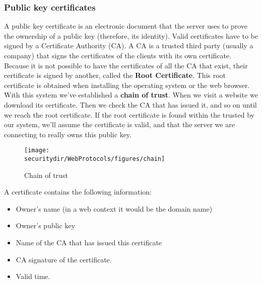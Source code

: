 \subsubsection{Public key certificates}
A public key certificate is an electronic document that the server uses to prove the ownership of a public key (therefore, its identity). Valid certificates have to be signed by a Certificate Authority (CA). A CA is a trusted third party (usually a company) that signs the certificates of the clients with its own certificate. Because it is not possible to have the certificates of all the CA that exist, their certificate is signed by another, called the \textbf{Root Certificate}. This root certificate is obtained when installing the operating system or the web browser. With this system we've established a \textbf{chain of trust}. When we visit a website we download its certificate. Then we check the CA that has issued it, and so on until we reach the root certificate. If the root certificate is found within the trusted by our system, we'll assume the certificate is valid, and that the server we are connecting to really owns this public key. 

\begin{figure}[htb]
	\begin{centering}
		\texttt{[image: \\securitydir/WebProtocols/figures/chain]}
		\par
	\end{centering}
	\caption{\label{fig:chain} Chain of trust}
\end{figure}

A certificate contains the following information:
\begin{itemize}
	\item Owner's name (in a web context it would be the domain name)
	\item Owner's public key
	\item Name of the CA that has issued this certificate
	\item CA signature of the certificate.
	\item Valid time.
\end{itemize}





